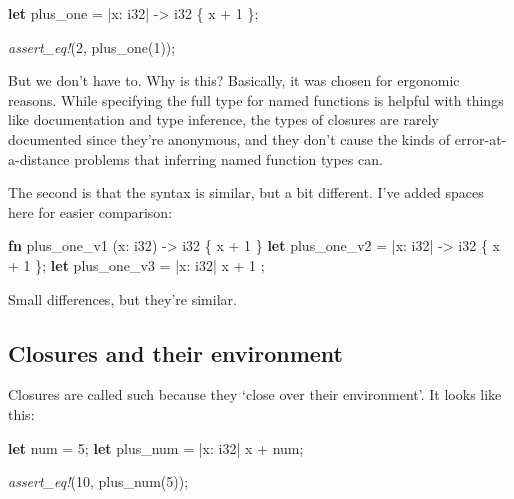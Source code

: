 \documentclass[a4paper,]{book}
\newenvironment{Shaded}{\begin{snugshade}}{\end{snugshade}}
\newcommand{\KeywordTok}[1]{\textcolor[rgb]{0.13,0.29,0.53}{\textbf{{#1}}}}
\newcommand{\DataTypeTok}[1]{\textcolor[rgb]{0.13,0.29,0.53}{{#1}}}
\newcommand{\DecValTok}[1]{\textcolor[rgb]{0.00,0.00,0.81}{{#1}}}
\newcommand{\PreprocessorTok}[1]{\textcolor[rgb]{0.56,0.35,0.01}{\textit{{#1}}}}
\newcommand{\NormalTok}[1]{{#1}}
\begin{document}
\begin{Shaded}
\begin{Highlighting}[]
\KeywordTok{let} \NormalTok{plus_one = |x: }\DataTypeTok{i32}\NormalTok{| -> }\DataTypeTok{i32} \NormalTok{\{ x + }\DecValTok{1} \NormalTok{\};}

\PreprocessorTok{assert_eq!}\NormalTok{(}\DecValTok{2}\NormalTok{, plus_one(}\DecValTok{1}\NormalTok{));}
\end{Highlighting}
\end{Shaded}

But we don't have to. Why is this? Basically, it was chosen for
ergonomic reasons. While specifying the full type for named functions is
helpful with things like documentation and type inference, the types of
closures are rarely documented since they're anonymous, and they don't
cause the kinds of error-at-a-distance problems that inferring named
function types can.

The second is that the syntax is similar, but a bit different. I've
added spaces here for easier comparison:

\begin{Shaded}
\begin{Highlighting}[]
\KeywordTok{fn}  \NormalTok{plus_one_v1   (x: }\DataTypeTok{i32}\NormalTok{) -> }\DataTypeTok{i32} \NormalTok{\{ x + }\DecValTok{1} \NormalTok{\}}
\KeywordTok{let} \NormalTok{plus_one_v2 = |x: }\DataTypeTok{i32}\NormalTok{| -> }\DataTypeTok{i32} \NormalTok{\{ x + }\DecValTok{1} \NormalTok{\};}
\KeywordTok{let} \NormalTok{plus_one_v3 = |x: }\DataTypeTok{i32}\NormalTok{|          x + }\DecValTok{1}  \NormalTok{;}
\end{Highlighting}
\end{Shaded}

Small differences, but they're similar.

\subsection{Closures and their
environment}\label{closures-and-their-environment}

Closures are called such because they `close over their environment'. It
looks like this:

\begin{Shaded}
\begin{Highlighting}[]
\KeywordTok{let} \NormalTok{num = }\DecValTok{5}\NormalTok{;}
\KeywordTok{let} \NormalTok{plus_num = |x: }\DataTypeTok{i32}\NormalTok{| x + num;}

\PreprocessorTok{assert_eq!}\NormalTok{(}\DecValTok{10}\NormalTok{, plus_num(}\DecValTok{5}\NormalTok{));}
\end{Highlighting}
\end{Shaded}
\end{document}
